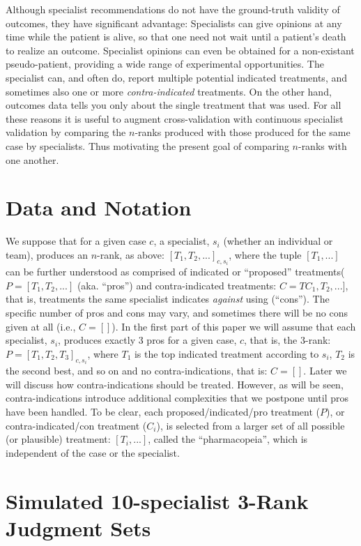 \documentclass{article}
\begin{document}
Although specialist recommendations do not have the ground-truth validity of outcomes, they have significant advantage: Specialists can give opinions at any time while the patient is alive, so that one need not wait until a patient's death to realize an outcome. Specialist opinions can even be obtained for a non-existant pseudo-patient, providing a wide range of experimental opportunities. The specialist can, and often do, report multiple potential indicated treatments, and sometimes also one or more \emph{contra-indicated} treatments. On the other hand, outcomes data tells you only about the single treatment that was used. For all these reasons it is useful to augment cross-validation with continuous specialist validation by comparing the $n$-ranks produced with those produced for the same case by specialists. Thus motivating the present goal of comparing $n$-ranks with one another. 

\section{Data and Notation}

We suppose that for a given case $c$, a specialist, $s_i$ (whether an individual or team), produces an $n$-rank, as above: $[T_1, T_2, ...]_{c,s_i}$, where the tuple $[T_1, ...]$ can be further understood as comprised of indicated or ``proposed'' treatments( $P=[T_1, T_2, ...]$ (aka. ``pros'') and contra-indicated treatments: $C=TC_1, T_2,...]$, that is, treatments the same specialist indicates \textit{against} using (``cons''). The specific number of pros and cons may vary, and sometimes there will be no cons given at all (i.e., $C=[]$). In the first part of this paper we will assume that each specialist, $s_i$, produces exactly 3 pros for a given case, $c$, that is, the $3$-rank: $P=[T_1, T_2, T_3]_{c,s_i}$, where $T_1$ is the top indicated treatment according to $s_i$, $T_2$ is the second best, and so on and no contra-indications, that is: $C=[]$. Later we will discuss how contra-indications should be treated. However, as will be seen, contra-indications introduce additional complexities that we postpone until pros  have been handled. To be clear, each proposed/indicated/pro treatment ($P$), or contra-indicated/con treatment ($C_i$), is selected from a larger set of all possible (or plausible) treatment: $[T_i,...]$, called the ``pharmacopeia'', which is independent of the case or the specialist.

\section{Simulated 10-specialist 3-Rank Judgment Sets}
\end{document}
